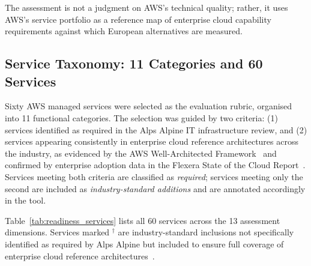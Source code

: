 The assessment is not a judgment on AWS's technical quality; rather, it uses AWS's service portfolio as a reference map of enterprise cloud capability requirements against which European alternatives are measured.

\subsection{Service Taxonomy: 11 Categories and 60 Services}
\label{subsec:service_taxonomy}

Sixty AWS managed services were selected as the evaluation rubric, organised into 11 functional categories. The selection was guided by two criteria: (1) services identified as required in the Alps Alpine IT infrastructure review, and (2) services appearing consistently in enterprise cloud reference architectures across the industry, as evidenced by the AWS Well-Architected Framework~\cite{AWS_WellArchitected_2023} and confirmed by enterprise adoption data in the Flexera State of the Cloud Report~\cite{Flexera_CloudReport_2024}. Services meeting both criteria are classified as \textit{required}; services meeting only the second are included as \textit{industry-standard additions} and are annotated accordingly in the tool.

Table~\ref{tab:readiness_services} lists all 60 services across the 13 assessment dimensions.
Services marked $^{\dagger}$ are industry-standard inclusions not specifically identified as
required by Alps Alpine but included to ensure full coverage of enterprise cloud reference
architectures~\cite{AWS_WellArchitected_2023, Flexera_CloudReport_2024}.

